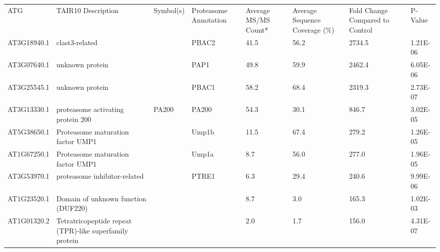 \begin{longtabu} to \textwidth {
|X[2,l]|
X[5,l]|
X[2,l]|
X[2,l]|
X[2,r]|
X[2,r]|
X[2,r]|
|X[2,r]|}
ATG         & TAIR10 Description                                         & Symbol(s) & Proteasome Annotation & Average MS/MS Count* & Average Sequence Coverage (\%) & Fold Change Compared to Control & P-Value  \\
AT3G18940.1 & clast3-related                                             &           & PBAC2                 & 41.5                 & 56.2                           & 2734.5                          & 1.21E-06 \\
AT3G07640.1 & unknown protein                                            &           & PAP1                  & 49.8                 & 59.9                           & 2462.4                          & 6.05E-06 \\
AT3G25545.1 & unknown protein                                            &           & PBAC1                 & 58.2                 & 68.4                           & 2319.3                          & 2.73E-07 \\
AT3G13330.1 & proteasome activating protein 200                          & PA200     & PA200                 & 54.3                 & 30.1                           & 846.7                           & 3.02E-05 \\
AT5G38650.1 & Proteasome maturation factor UMP1                          &           & Ump1b                 & 11.5                 & 67.4                           & 279.2                           & 1.26E-05 \\
AT1G67250.1 & Proteasome maturation factor UMP1                          &           & Ump1a                 & 8.7                  & 56.0                           & 277.0                           & 1.96E-05 \\
AT3G53970.1 & proteasome inhibitor-related                               &           & PTRE1                 & 6.3                  & 29.4                           & 240.6                           & 9.99E-06 \\
AT1G23520.1 & Domain of unknown function (DUF220)                        &           &                       & 8.7                  & 3.0                            & 165.3                           & 1.02E-03 \\
AT1G01320.2 & Tetratricopeptide repeat (TPR)-like superfamily protein    &           &                       & 2.0                  & 1.7                            & 156.0                           & 4.31E-07 \\

\end{longtabu}
